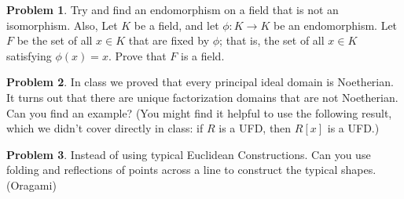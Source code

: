 \documentclass[letterpaper, 12pt]{article}
\theoremstyle{definition}
\newtheorem{problem}{Problem}
\begin{document}
\begin{problem}
    Try and find an endomorphism on a field that is not an isomorphism. Also, Let $K$ be a field, and let $\phi : K \rightarrow K$ be an endomorphism. Let $F$ be the set of all $x \in K$ that are fixed by $\phi$; that is, the set of all $x \in K$ satisfying $\phi(x) = x$. Prove that $F$ is a field.
\end{problem}

\begin{problem}
    In class we proved that every principal ideal domain is Noetherian. It turns out that there are unique factorization domains that are not Noetherian. Can you find an example? (You might find it helpful to use the following result, which we didn’t cover directly in class: if $R$ is a UFD, then $R[x]$ is a UFD.)    
\end{problem}

\begin{problem}
    Instead of using typical Euclidean Constructions. Can you use folding and reflections of points across a line to construct the typical shapes. (Oragami)
\end{problem}
\end{document}

